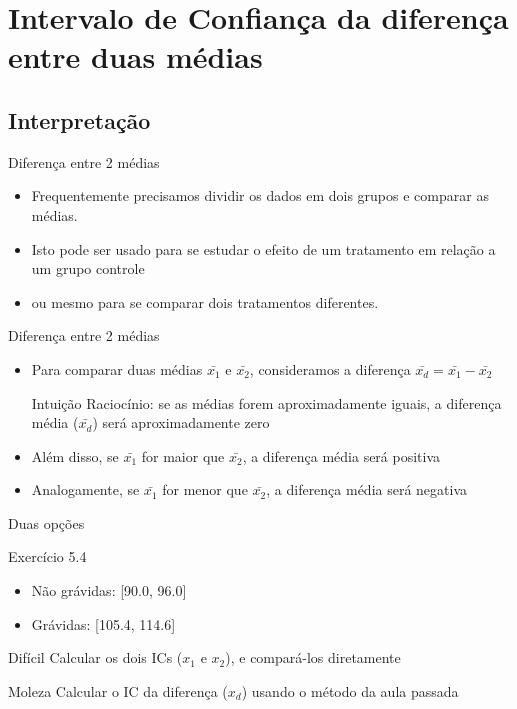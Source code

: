 \documentclass{beamer}
\begin{document}
\section[IC diferença 2 médias]{Intervalo de Confiança da diferença entre duas médias}

\subsection{Interpretação}

\begin{frame}{Diferença entre 2 médias}
  \begin{itemize}
  \item Frequentemente precisamos dividir os dados em dois grupos e
    comparar as médias.
  \item Isto pode ser usado para se estudar o efeito de um tratamento
    em relação a um grupo controle
  \item ou mesmo para se comparar dois tratamentos diferentes.
  \end{itemize}
\end{frame}

\begin{frame}{Diferença entre 2 médias}
  \begin{itemize}
  \item Para comparar duas médias $\bar{x_1}$ e $\bar{x_2}$, consideramos a diferença $\bar{x_d} = \bar{x_1} - \bar{x_2}$
    \begin{block}{Intuição}
      Raciocínio: se as médias forem aproximadamente iguais, a
      diferença média ($\bar{x_d}$) será aproximadamente zero
    \end{block}
  \item Além disso, se $\bar{x_1}$ for maior que $\bar{x_2}$, a diferença média será positiva
  \item Analogamente, se $\bar{x_1}$ for menor que $\bar{x_2}$, a diferença média será negativa
  \end{itemize}
\end{frame}

\begin{frame}{Duas opções}
  \begin{exampleblock}{Exercício 5.4}
    \begin{itemize}
    \item Não grávidas: [90.0, 96.0]
    \item Grávidas: [105.4, 114.6]
    \end{itemize}
  \end{exampleblock}
  \begin{block}{Difícil}
    Calcular os dois ICs ($x_1$ e $x_2$), e compará-los diretamente
  \end{block}
  \begin{block}{Moleza}
    Calcular o IC da diferença ($x_d$) usando o método da aula passada
  \end{block}
\end{frame}
\end{document}

